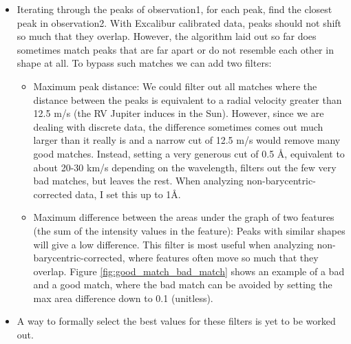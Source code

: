     \begin{itemize}
        \item Iterating through the peaks of observation1, for each peak, find the closest peak in observation2. With Excalibur calibrated data, peaks should not shift so much that they overlap. However, the algorithm laid out so far does sometimes match peaks that are far apart or do not resemble each other in shape at all. To bypass such matches we can add two filters:
        \begin{itemize}
            \item Maximum peak distance: We could filter out all matches where the distance between the peaks is equivalent to a radial velocity greater than 12.5 m/s (the RV Jupiter induces in the Sun). However, since we are dealing with discrete data, the difference sometimes comes out much larger than it really is and a narrow cut of 12.5 m/s would remove many good matches. Instead, setting a very generous cut of 0.5 Å, equivalent to about 20-30 km/s depending on the wavelength, filters out the few very bad matches, but leaves the rest. When analyzing non-barycentric-corrected data, I set this up to 1Å. 
            
            \item Maximum difference between the areas under the graph of two features (the sum of the intensity values in the feature): Peaks with similar shapes will give a low difference. This filter is most useful when analyzing non-barycentric-corrected, where features often move so much that they overlap. Figure \ref{fig:good_match_bad_match} shows an example of a bad and a good match, where the bad match can be avoided by setting the max area difference down to 0.1 (unitless). 
        \end{itemize}
        \item A way to formally select the best values for these filters is yet to be worked out.
    \end{itemize}


